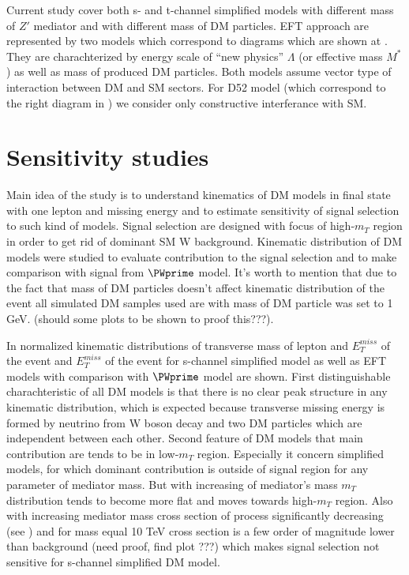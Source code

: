 Current study cover both s- and t-channel simplified models with different mass of $Z'$ mediator and with different mass of DM particles.
EFT approach are represented by two models which correspond to diagrams which are shown at . 
They are charachterized by energy scale of ``new physics'' $\Lambda$ (or effective mass $M^{*}$) as well as mass of produced DM particles.
Both models assume vector type of interaction between DM and SM sectors. For D52 model (which correspond to the right diagram in  ) 
we consider only constructive interferance with SM.

\section{Sensitivity studies}

Main idea of the study is to understand kinematics of DM models in final state with one lepton and missing energy and to estimate sensitivity 
of signal selection to such kind of models.
Signal selection are designed with focus of high-$m_{T}$ region in order to get rid of dominant SM W background.
Kinematic distribution of DM models were studied to evaluate contribution to the signal selection and to make comparison
with signal from $\PWprime$ model.
It's worth to mention that due to the fact that mass of DM particles doesn't affect kinematic distribution of the event 
all simulated DM samples used are with mass of DM particle was set to 1 GeV.
(should some plots to be shown to proof this???).

In  normalized kinematic distributions of transverse mass of lepton and $E_{T}^{miss}$ of the event
and $E_{T}^{miss}$ of the event for s-channel simplified model as well as EFT models with comparison with $\PWprime$ model are shown.
First distinguishable charachteristic of all DM models is that there is no clear peak structure in any kinematic distribution, 
which is expected because transverse missing energy is formed by
neutrino from W boson decay and two DM particles which are independent between each other. 
Second feature of DM models that main contribution are tends to be in low-$m_{T}$ region.
Especially it concern simplified models, for which dominant contribution is outside of signal region for any parameter of mediator mass.
But with increasing of mediator's mass $m_{T}$ distribution tends to become more flat and moves towards high-$m_{T}$ region.
Also with increasing mediator mass cross section of process significantly decreasing (see ) 
and for mass equal 10 TeV cross section is a few order of magnitude lower than background (need proof, find plot ???) which 
makes signal selection not sensitive for s-channel simplified DM model.

